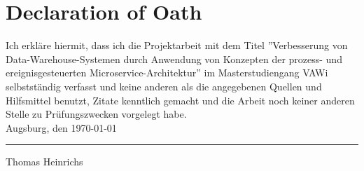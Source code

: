 \section*{Declaration of Oath}

Ich erkläre hiermit, dass ich die Projektarbeit mit dem Titel ''Verbesserung von Data-Warehouse-Systemen durch Anwendung von Konzepten der prozess- und ereignisgesteuerten Microservice-Architektur'' im Masterstudiengang VAWi selbstständig verfasst und keine anderen als die angegebenen Quellen und Hilfsmittel benutzt, Zitate kenntlich gemacht und die Arbeit noch keiner anderen Stelle zu Prüfungszwecken vorgelegt habe. \newline \\[0.5cm]
Augsburg, den \today \newline \\[1cm]
\hfill\parbox{4cm}{\hrule
\strut \centering\footnotesize Thomas Heinrichs}
\newpage